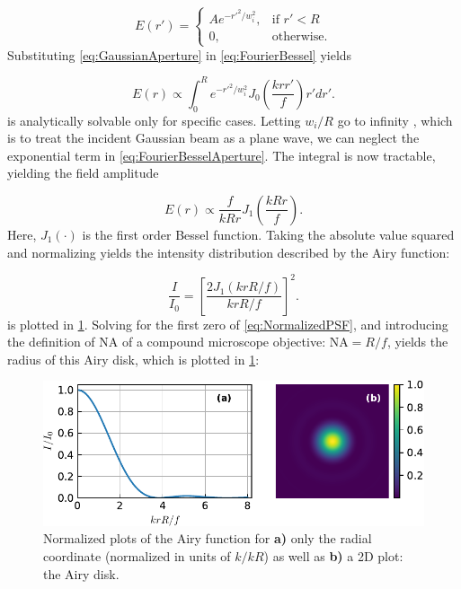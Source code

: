 \begin{equation}\label{eq:GaussianAperture}
    E(r')=
    \begin{cases}
        A e^{- r'^2/w_i^2},& \text{if } r' < R\\
        0,               & \text{otherwise}.
    \end{cases}
\end{equation}
Substituting \cref{eq:GaussianAperture} in \cref{eq:FourierBessel} yields

\begin{equation}\label{eq:FourierBesselAperture}
    E(r) \propto \int_0^R e^{-r'^2/w_i^2} J_0\left(\frac{k r r'}{f}\right)r'dr'.
\end{equation}
 is analytically solvable only for specific cases.
Letting $w_i/R$ go to infinity \cite{Madjarov2020}, which is to treat the incident Gaussian beam as a plane wave, we can neglect the exponential term in \cref{eq:FourierBesselAperture}. 
The integral is now tractable, yielding the field amplitude

\begin{equation}\label{eq:AiryField}
    E(r) \propto \frac{f}{kRr} J_1\left(\frac{k R r}{f}\right).
\end{equation}
Here, $J_1(\cdot)$ is the first order Bessel function.
Taking the absolute value squared and normalizing yields the intensity distribution described by the Airy function:

\begin{equation}\label{eq:NormalizedPSF}
    \frac{I}{I_0} = \left[
    \frac{2J_1(k r R/f)}{k r R/f}
    \right]^2.
\end{equation}
 is plotted in \cref{fig:AiryPlots}.
Solving for the first zero of \cref{eq:NormalizedPSF}, and introducing the definition of \ac{NA} of a compound microscope objective: $\text{NA} = R/f$, yields the radius of this Airy disk, which is plotted in \cref{fig:AiryPlots}:

\begin{figure}
    \centering
    \includegraphics[width = 0.9\linewidth]{figures/AiryDisk.pdf}
    \caption{Normalized plots of the Airy function for \textsf{\textbf{a)}} only the radial coordinate (normalized in units of $k/kR$) as well as \textsf{\textbf{b)}} a 2D plot: the Airy disk.}
    \label{fig:AiryPlots}
\end{figure}

